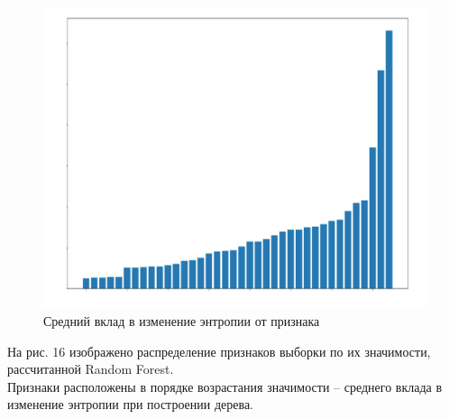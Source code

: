         \newpage
        \begin{figure}[h!]
            \centering
            \includegraphics[scale=0.5]{pictures/RF-ff.png}
            \caption{Средний вклад в изменение энтропии от признака
            }
            \label{fig:my_label}
        \end{figure} 
        
        На рис. 16 изображено распределение признаков выборки по их значимости, рассчитанной Random Forest.\\ Признаки расположены в порядке возрастания значимости -- среднего вклада в изменение энтропии при построении дерева.\\
        
